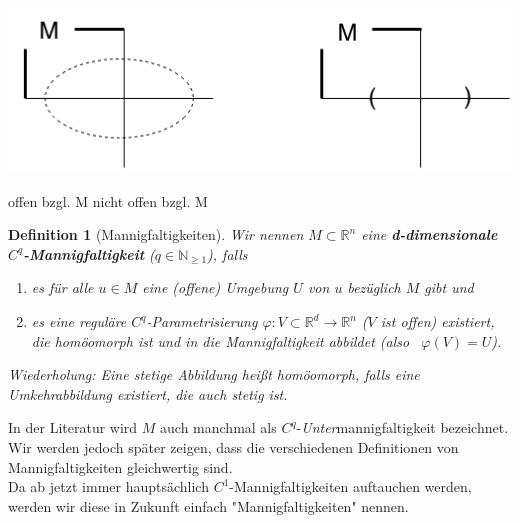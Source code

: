 \documentclass[a4paper,12pt,portrait]{book}
\theoremstyle{theoremstyle}
\newtheorem*{definition}{Definition}
\begin{document}
\begin{center}
\includegraphics[scale=0.5]{pictures/MA2_0007}\\
\end{center}
\hspace{70pt} offen bzgl. M \hspace{70pt} nicht offen bzgl. M\\

\begin{definition}[Mannigfaltigkeiten]
Wir nennen $M\subset\mathbb{R}^n$ eine \textbf{d-dimensionale $C^q$-Mannigfaltigkeit} ($q\in\mathbb{N}_{\geq 1}$), falls

\begin{enumerate}
\item es für alle $u\in M$ eine (offene) Umgebung $U$ von $u$ bezüglich $M$ gibt und
\item es eine reguläre $C^q$-Parametrisierung $\varphi:V\subset\mathbb{R}^d\rightarrow\mathbb{R}^n$ ($V$ ist offen) existiert, die homöomorph ist und in die Mannigfaltigkeit abbildet (also \  $\varphi(V)=U$).
\end{enumerate}
\emph{Wiederholung: Eine stetige Abbildung heißt homöomorph, falls eine Umkehrabbildung existiert, die auch stetig ist.}\\
\end{definition}
In der Literatur wird $M$ auch manchmal als $C^q$-\emph{Unter}mannigfaltigkeit bezeichnet. Wir werden jedoch später zeigen, dass die verschiedenen Definitionen von Mannigfaltigkeiten gleichwertig sind.\\
Da ab jetzt immer hauptsächlich $C^1$-Mannigfaltigkeiten auftauchen werden, werden wir diese in Zukunft einfach "Mannigfaltigkeiten" nennen.\\
\end{document}
